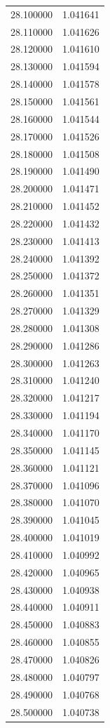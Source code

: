 \begin{tabular}{rr}
28.100000 & 1.041641 \\
28.110000 & 1.041626 \\
28.120000 & 1.041610 \\
28.130000 & 1.041594 \\
28.140000 & 1.041578 \\
28.150000 & 1.041561 \\
28.160000 & 1.041544 \\
28.170000 & 1.041526 \\
28.180000 & 1.041508 \\
28.190000 & 1.041490 \\
28.200000 & 1.041471 \\
28.210000 & 1.041452 \\
28.220000 & 1.041432 \\
28.230000 & 1.041413 \\
28.240000 & 1.041392 \\
28.250000 & 1.041372 \\
28.260000 & 1.041351 \\
28.270000 & 1.041329 \\
28.280000 & 1.041308 \\
28.290000 & 1.041286 \\
28.300000 & 1.041263 \\
28.310000 & 1.041240 \\
28.320000 & 1.041217 \\
28.330000 & 1.041194 \\
28.340000 & 1.041170 \\
28.350000 & 1.041145 \\
28.360000 & 1.041121 \\
28.370000 & 1.041096 \\
28.380000 & 1.041070 \\
28.390000 & 1.041045 \\
28.400000 & 1.041019 \\
28.410000 & 1.040992 \\
28.420000 & 1.040965 \\
28.430000 & 1.040938 \\
28.440000 & 1.040911 \\
28.450000 & 1.040883 \\
28.460000 & 1.040855 \\
28.470000 & 1.040826 \\
28.480000 & 1.040797 \\
28.490000 & 1.040768 \\
28.500000 & 1.040738 \\

\end{tabular}
